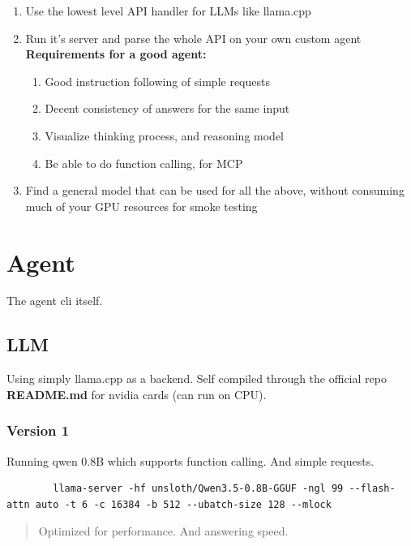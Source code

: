 \documentclass[12pt, a4paper, oneside]{report}
\begin{document}
	\begin{enumerate}
    \item Use the lowest level API handler for LLMs like llama.cpp
	\item Run it's server and parse the whole API on your own custom agent
		\newline\newline \textbf{Requirements for a good agent:}
		\begin{enumerate}
			\item Good instruction following of simple requests
			\item Decent consistency of answers for the same input
			\item Visualize thinking process, and reasoning model
			\item Be able to do function calling, for MCP
		\end{enumerate}
	\item Find a general model that can be used for all the above,
	without consuming much of your GPU resources for smoke testing
	\end{enumerate}

	\chapter{Agent}\label{ch:chat}

	The agent cli itself.

	\section{LLM}

	Using simply llama.cpp as a backend. Self compiled through the official repo \textbf{README.md} for nvidia cards (can run on CPU).

	\subsection{Version 1}

	Running qwen 0.8B which supports function calling. And simple requests.

	\begin{verbatim}
		llama-server -hf unsloth/Qwen3.5-0.8B-GGUF -ngl 99 --flash-attn auto -t 6 -c 16384 -b 512 --ubatch-size 128 --mlock
	\end{verbatim}

	\begin{quote}
		Optimized for performance. And answering speed.
	\end{quote}
\end{document}
